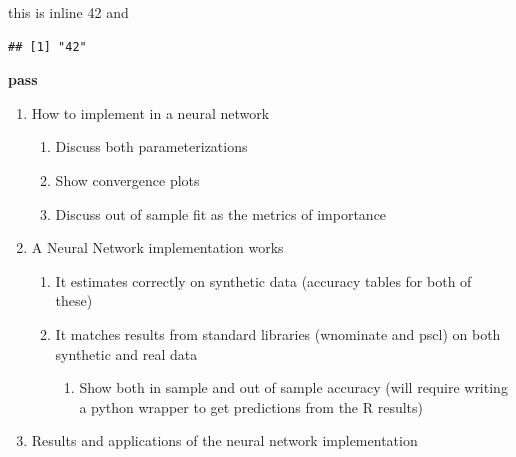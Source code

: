 \documentclass[11pt,]{article}
\newenvironment{Shaded}{\begin{snugshade}}{\end{snugshade}}
\newcommand{\ControlFlowTok}[1]{\textcolor[rgb]{0.13,0.29,0.53}{\textbf{#1}}}
\newcommand{\OperatorTok}[1]{\textcolor[rgb]{0.81,0.36,0.00}{\textbf{#1}}}
\newcommand{\NormalTok}[1]{#1}
\providecommand{\tightlist}{%
\setlength{\itemsep}{0pt}\setlength{\parskip}{0pt}}
\begin{document}
this is inline 42 and

\begin{Shaded}
\end{Shaded}

\begin{verbatim}
## [1] "42"
\end{verbatim}

\begin{Shaded}
\begin{Highlighting}[]
\ControlFlowTok{pass}
\end{Highlighting}
\end{Shaded}

\begin{enumerate}
\def\labelenumi{\arabic{enumi}.}
\tightlist
\item
  How to implement in a neural network

  \begin{enumerate}
  \def\labelenumii{\alph{enumii}.}
  \tightlist
  \item
    Discuss both parameterizations
  \item
    Show convergence plots
  \item
    Discuss out of sample fit as the metrics of importance
  \end{enumerate}
\item
  A Neural Network implementation works

  \begin{enumerate}
  \def\labelenumii{\alph{enumii}.}
  \tightlist
  \item
    It estimates correctly on synthetic data (accuracy tables for both
    of these)
  \item
    It matches results from standard libraries (wnominate and pscl) on
    both synthetic and real data

    \begin{enumerate}
    \def\labelenumiii{\roman{enumiii}.}
    \tightlist
    \item
      Show both in sample and out of sample accuracy (will require
      writing a python wrapper to get predictions from the R results)
    \end{enumerate}
  \end{enumerate}
\item
  Results and applications of the neural network implementation


\end{enumerate}
\end{document}
